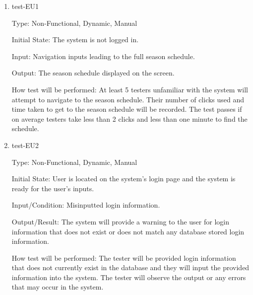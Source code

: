\documentclass[12pt, titlepage]{article}
\begin{document}
\begin{enumerate}

  \item{test-EU1\\}

  Type: Non-Functional, Dynamic, Manual

  Initial State: The system is not logged in.

  Input: Navigation inputs leading to the full season schedule.

  Output: The season schedule displayed on the screen.

  How test will be performed: At least 5 testers unfamiliar with the system will
  attempt to navigate to the season schedule. Their number of clicks used and
  time taken to get to the season schedule will be recorded. The test passes
  if on average testers take less than 2 clicks and less than one minute to
  find the schedule.

  \item{test-EU2\\}

  Type: Non-Functional, Dynamic, Manual

  Initial State: User is located on the system's login page and the system is ready
  for the user's inputs.

  Input/Condition: Misinputted login information.

  Output/Result: The system will provide a warning to the user for login information that
  does not exist or does not match any database stored login information.

  How test will be performed: The tester will be provided login information that does not
  currently exist in the database and they will input the provided information into the
  system. The tester will observe the output or any errors that may occur in the system.

  
            
            
            
            

\end{enumerate}
\end{document}
